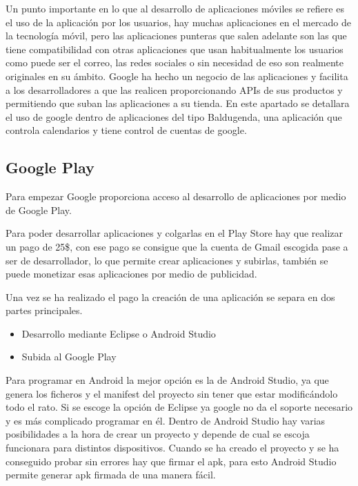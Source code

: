 Un punto importante en lo que al desarrollo de aplicaciones móviles se refiere es el uso de la aplicación por los usuarios, hay muchas aplicaciones en el mercado de la tecnología móvil, pero las aplicaciones punteras que salen adelante son las que tiene compatibilidad con otras aplicaciones que usan habitualmente los usuarios como puede ser el correo, las redes sociales o sin necesidad de eso son realmente originales en su ámbito.
Google ha hecho un negocio de las aplicaciones  y facilita a los desarrolladores a que las realicen proporcionando APIs de sus productos y permitiendo que suban las aplicaciones a su tienda.
En este apartado se detallara el uso de google dentro de aplicaciones del tipo Baldugenda, una aplicación que controla calendarios y tiene control de cuentas de google.

\subsection{Google Play}
\label{subsecc:Google Play}

Para empezar Google proporciona acceso al desarrollo de aplicaciones por medio de Google Play.

Para poder desarrollar aplicaciones y colgarlas en el Play Store hay que realizar un pago de 25\$, con ese pago se consigue que la cuenta de Gmail escogida pase a ser de desarrollador, lo que permite crear aplicaciones y subirlas, también se puede monetizar esas aplicaciones por medio de publicidad.

Una vez se ha realizado el pago la creación de una aplicación se separa en dos partes principales.

\begin{itemize}
\item Desarrollo mediante Eclipse o Android Studio
\item Subida al Google Play
\end{itemize}

Para programar en Android la mejor opción es la de Android Studio, ya que genera los ficheros y el manifest del proyecto sin tener que estar modificándolo todo el rato.
Si se escoge la opción de Eclipse ya google no da el soporte necesario y es más complicado programar en él.
Dentro de Android Studio hay varias posibilidades a la hora de crear un proyecto y depende de cual se escoja funcionara para distintos dispositivos.
Cuando se ha creado el proyecto y se ha conseguido probar sin errores hay que firmar el apk, para esto Android Studio permite generar apk firmada de una manera fácil.

